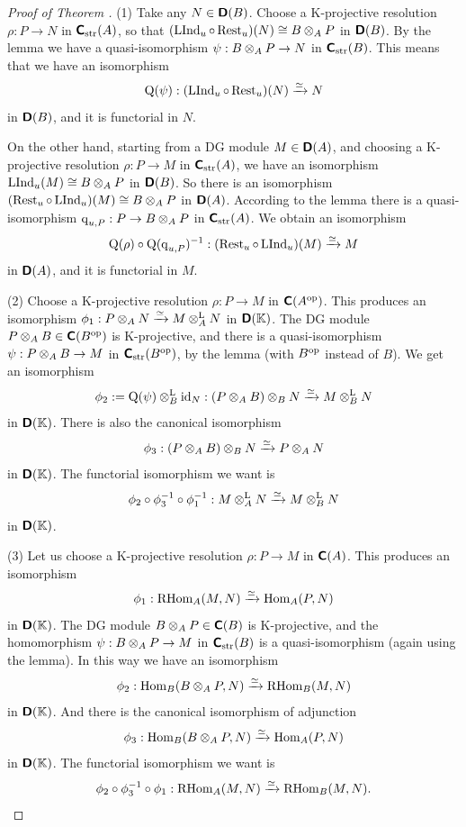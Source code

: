 \begin{proof}[Proof of Theorem \tup{\ref{thm:2363}}] \mbox{}

\smallskip \noindent
(1) Take any $N \in \boldsymbol{\mathsf{D}}(B)$. 
Choose a K-projective resolution $\rho : P \to N$ in 
$\boldsymbol{\mathsf{C}}_{\mathrm{str}}(A)$, so that 
$(\operatorname{LInd}_u \circ \operatorname{Rest}_u)(N) \cong B \otimes_A P$
in $\boldsymbol{\mathsf{D}}(B)$. By the lemma we have a quasi-isomorphism 
$\psi : B \otimes_A P \to N$ in $\boldsymbol{\mathsf{C}}_{\mathrm{str}}(B)$.
This means that we have an isomorphism
\[ \operatorname{Q}(\psi) : (\operatorname{LInd}_u \circ \operatorname{Rest}_u)(N) \xrightarrow{\simeq} N \]
in $\boldsymbol{\mathsf{D}}(B)$, and it is functorial in $N$. 

On the other hand, starting from a DG module $M \in \boldsymbol{\mathsf{D}}(A)$, 
and choosing a K-projective resolution $\rho : P \to M$
in $\boldsymbol{\mathsf{C}}_{\mathrm{str}}(A)$, we have an isomorphism 
$\operatorname{LInd}_u(M) \cong B \otimes_A P$
in $\boldsymbol{\mathsf{D}}(B)$. So there is an isomorphism 
$(\opn{Rest}_u \circ \opn{LInd}_u)(M) \cong \lb B \ot_A P$
in $\boldsymbol{\mathsf{D}}(A)$. According to the lemma there is a quasi-isomorphism 
$\operatorname{q}_{u, P} : P \to B \otimes_A P$
in $\boldsymbol{\mathsf{C}}_{\mathrm{str}}(A)$.
We obtain an isomorphism 
\[ \operatorname{Q}(\rho) \circ \operatorname{Q}(\operatorname{q}_{u, P})^{-1} : 
(\operatorname{Rest}_u \circ \operatorname{LInd}_u)(M) \xrightarrow{\simeq} M \]
in $\boldsymbol{\mathsf{D}}(A)$, and it is functorial in $M$. 

\medskip \noindent
(2) Choose a K-projective resolution $\rho : P \to M$ in 
$\boldsymbol{\mathsf{C}}(A^{\mathrm{op}})$. 
This produces an isomorphism 
$\phi_1 : P \otimes_A N \xrightarrow{\simeq} M \otimes^{\mathrm{L}}_A N$
in $\boldsymbol{\mathsf{D}}(\mathbb{K})$. The DG module 
$P \otimes_A B \in \boldsymbol{\mathsf{C}}(B^{\mathrm{op}})$
is K-projective, and there is a quasi-isomorphism
$\psi : P \otimes_A B \to M$ in 
$\boldsymbol{\mathsf{C}}_{\mathrm{str}}(B^{\mathrm{op}})$,
by the lemma (with $B^{\mathrm{op}}$ instead of $B$). 
We get an isomorphism 
\[ \phi_2 := \operatorname{Q}(\psi) \otimes^{\mathrm{L}}_B \operatorname{id}_N : 
(P \otimes_A B) \otimes_B N \xrightarrow{\simeq} M \otimes^{\mathrm{L}}_B N \]
in $\boldsymbol{\mathsf{D}}(\mathbb{K})$.
There is also the canonical isomorphism 
\[ \phi_3 : (P \otimes_A B) \otimes_B N \xrightarrow{\simeq} P \otimes_A N \]
in  $\boldsymbol{\mathsf{D}}(\mathbb{K})$. 
The functorial isomorphism we want is 
\[ \phi_2 \circ \phi_3^{-1} \circ \phi_1^{-1} : 
M \otimes^{\mathrm{L}}_A N \xrightarrow{\simeq} M \otimes^{\mathrm{L}}_B N \]
in $\boldsymbol{\mathsf{D}}(\mathbb{K})$. 

\medskip \noindent
(3) Let us choose a K-projective resolution 
$\rho : P \to M$ in $\boldsymbol{\mathsf{C}}(A)$. 
This produces an isomorphism 
\[ \phi_1 : \operatorname{RHom}_{A}(M, N) \xrightarrow{\simeq} \operatorname{Hom}_{A}(P, N)  \]
in $\boldsymbol{\mathsf{D}}(\mathbb{K})$. The DG module 
$B \otimes_A P \in \boldsymbol{\mathsf{C}}(B)$ is K-projective, and the homomorphism 
$\psi : B \otimes_A P \to M$ 
in $\boldsymbol{\mathsf{C}}_{\mathrm{str}}(B)$ is a quasi-isomorphism (again using the lemma). 
In this way we have an isomorphism 
\[ \phi_2 : \operatorname{Hom}_{B}(B \otimes_A P, N) \xrightarrow{\simeq} \operatorname{RHom}_{B}(M, N) \]
in $\boldsymbol{\mathsf{D}}(\mathbb{K})$. And there is the canonical isomorphism of adjunction 
\[ \phi_3 : \operatorname{Hom}_{B}(B \otimes_A P, N) \xrightarrow{\simeq} \operatorname{Hom}_{A}(P, N) \]
in $\boldsymbol{\mathsf{D}}(\mathbb{K})$.
The functorial isomorphism we want is
\[ \phi_2 \circ \phi_3^{-1} \circ \phi_1 :
\operatorname{RHom}_{A}(M, N) \xrightarrow{\simeq} \operatorname{RHom}_{B}(M, N) . \qedhere \]
\end{proof}







